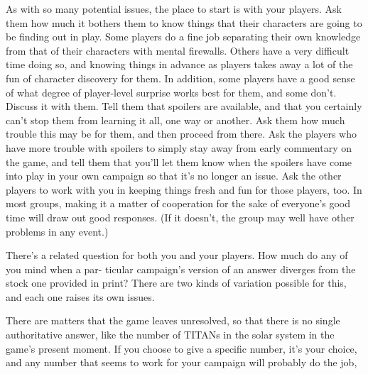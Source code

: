As with so many potential issues, the place to start 
is with your players. Ask them how much it bothers 
them to know things that their characters are going 
to be finding out in play. Some players do a fine job 
separating their own knowledge from that of their 
characters with mental firewalls. Others have a very 
difficult time doing so, and knowing things in advance 
as players takes away a lot of the fun of character 
discovery for them. In addition, some players have 
a good sense of what degree of player-level surprise 
works best for them, and some don't. Discuss it with 
them. Tell them that spoilers are available, and that 
you certainly can't stop them from learning it all, one 
way or another. Ask them how much trouble this may 
be for them, and then proceed from there. Ask the 
players who have more trouble with spoilers to simply 
stay away from early commentary on the game, and 
tell them that you'll let them know when the spoilers 
have come into play in your own campaign so that 
it's no longer an issue. Ask the other players to work 
with you in keeping things fresh and fun for those 
players, too. In most groups, making it a matter of 
cooperation for the sake of everyone's good time will 
draw out good responses. (If it doesn't, the group may 
well have other problems in any event.) 

There's a related question for both you and your 
players. How much do any of you mind when a par-
ticular campaign's version of an answer diverges from 
the stock one provided in print? There are two kinds 
of variation possible for this, and each one raises its 
own issues. 

There are matters that the game leaves unresolved, 
so that there is no single authoritative answer, like the 
number of TITANs in the solar system in the game's 
present moment. If you choose to give a specific 
number, it's your choice, and any number that seems 
to work for your campaign will probably do the job, 
